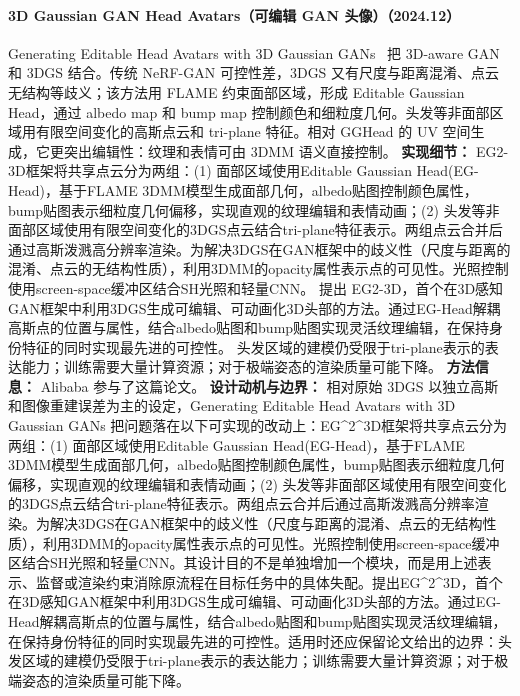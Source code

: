\paragraph{3D Gaussian GAN Head Avatars（可编辑 GAN 头像）（2024.12）}
Generating Editable Head Avatars with 3D Gaussian GANs~\cite{2412_19149} 把 3D-aware GAN 和 3DGS 结合。传统 NeRF-GAN 可控性差，3DGS 又有尺度与距离混淆、点云无结构等歧义；该方法用 FLAME 约束面部区域，形成 Editable Gaussian Head，通过 albedo map 和 bump map 控制颜色和细粒度几何。头发等非面部区域用有限空间变化的高斯点云和 tri-plane 特征。相对 GGHead 的 UV 空间生成，它更突出编辑性：纹理和表情可由 3DMM 语义直接控制。
\textbf{实现细节：} EG2-3D框架将共享点云分为两组：(1) 面部区域使用Editable Gaussian Head(EG-Head)，基于FLAME 3DMM模型生成面部几何，albedo贴图控制颜色属性，bump贴图表示细粒度几何偏移，实现直观的纹理编辑和表情动画；(2) 头发等非面部区域使用有限空间变化的3DGS点云结合tri-plane特征表示。两组点云合并后通过高斯泼溅高分辨率渲染。为解决3DGS在GAN框架中的歧义性（尺度与距离的混淆、点云的无结构性质），利用3DMM的opacity属性表示点的可见性。光照控制使用screen-space缓冲区结合SH光照和轻量CNN。 提出 EG2-3D，首个在3D感知GAN框架中利用3DGS生成可编辑、可动画化3D头部的方法。通过EG-Head解耦高斯点的位置与属性，结合albedo贴图和bump贴图实现灵活纹理编辑，在保持身份特征的同时实现最先进的可控性。 头发区域的建模仍受限于tri-plane表示的表达能力；训练需要大量计算资源；对于极端姿态的渲染质量可能下降。
\textbf{方法信息：} Alibaba 参与了这篇论文。
\textbf{设计动机与边界：} 相对原始 3DGS 以独立高斯和图像重建误差为主的设定，Generating Editable Head Avatars with 3D Gaussian GANs 把问题落在以下可实现的改动上：EG\^{}2\^{}3D框架将共享点云分为两组：(1) 面部区域使用Editable Gaussian Head(EG-Head)，基于FLAME 3DMM模型生成面部几何，albedo贴图控制颜色属性，bump贴图表示细粒度几何偏移，实现直观的纹理编辑和表情动画；(2) 头发等非面部区域使用有限空间变化的3DGS点云结合tri-plane特征表示。两组点云合并后通过高斯泼溅高分辨率渲染。为解决3DGS在GAN框架中的歧义性（尺度与距离的混淆、点云的无结构性质），利用3DMM的opacity属性表示点的可见性。光照控制使用screen-space缓冲区结合SH光照和轻量CNN。其设计目的不是单独增加一个模块，而是用上述表示、监督或渲染约束消除原流程在目标任务中的具体失配。提出EG\^{}2\^{}3D，首个在3D感知GAN框架中利用3DGS生成可编辑、可动画化3D头部的方法。通过EG-Head解耦高斯点的位置与属性，结合albedo贴图和bump贴图实现灵活纹理编辑，在保持身份特征的同时实现最先进的可控性。适用时还应保留论文给出的边界：头发区域的建模仍受限于tri-plane表示的表达能力；训练需要大量计算资源；对于极端姿态的渲染质量可能下降。
